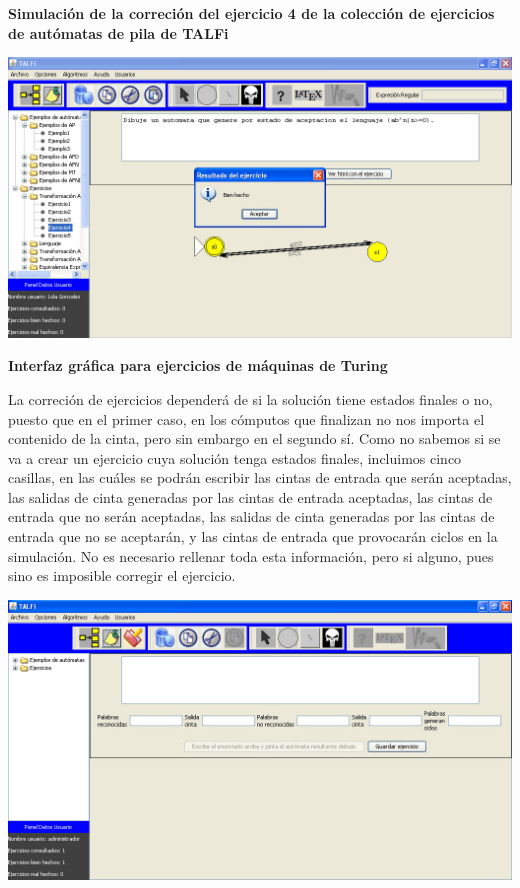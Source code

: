 \documentclass[12pt,a4paper,spanish]{book}
\begin{document}
{\bf Simulaci\'{o}n de la correci\'{o}n del ejercicio 4 de la colecci\'{o}n de ejercicios de aut\'{o}matas de pila de TALFi}

\begin{center}
\includegraphics[width=\textwidth]{resolucionej4.jpg}
\end{center} 

{\bf  Interfaz gr\'{a}fica para ejercicios de m\'aquinas de Turing \\}

La correci\'on de ejercicios depender\'a de si la soluci\'on tiene estados finales o no, puesto que en el primer caso, en los c\'omputos que finalizan no nos importa el contenido de la cinta, pero sin embargo en el segundo s\'i. Como no sabemos si se va a crear un ejercicio cuya soluci\'on tenga estados finales, incluimos cinco casillas, en las cu\'ales se podr\'an escribir las cintas de entrada que ser\'an aceptadas, las salidas de cinta generadas por las cintas de entrada aceptadas, las cintas de entrada que no ser\'an aceptadas, las salidas de cinta generadas por las cintas de entrada que no se aceptar\'an, y las cintas de entrada que provocar\'an ciclos en la simulaci\'on.  No es necesario rellenar toda esta informaci\'on, pero si alguno, pues sino es imposible corregir el ejercicio.


\begin{center}
\includegraphics[width=\textwidth]{crearejmt.jpg}
\end{center} 
\end{document}
